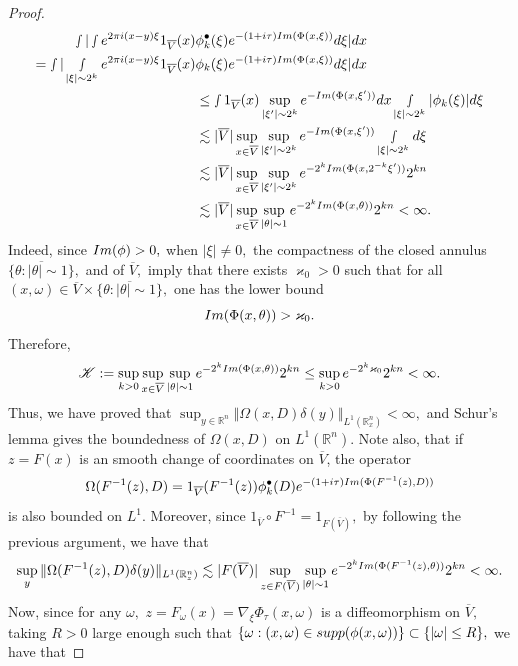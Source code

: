 \documentclass[12pt, reqno]{amsart}
\theoremstyle{definition}
\theoremstyle{remark}
\numberwithin{equation}{section}
\begin{document}
\begin{proof}
\begin{align*}
    \smallint|\smallint e^{2\pi i(x-y)\xi}1_{\overline{V}}(x) &\phi_{k}^\bullet(\xi)e^{-(1+i\tau)\textnormal{Im}(\Phi(x,\xi))}d\xi|dx \\
   = \smallint|\smallint_{|\xi|\sim 2^k} e^{2\pi i(x-y)\xi}1_{\overline{V}}(x) &\phi_{k}(\xi)e^{-(1+i\tau)\textnormal{Im}(\Phi(x,\xi))}d\xi|dx \\
    &\leq \smallint   1_{\overline{V}}(x)\sup_{|\xi'|\sim 2^{k}}e^{-\textnormal{Im}(\Phi(x,\xi'))} dx\smallint_{|\xi|\sim 2^{k}}|\phi_{k}(\xi)| d\xi\\
    &\lesssim |\overline{V}|\sup_{x\in \overline{V}} \sup_{|\xi'|\sim 2^{k}}e^{-\textnormal{Im}(\Phi(x,\xi'))}\smallint_{|\xi|\sim 2^{k}}d\xi\\
    &\lesssim |\overline{V}|\sup_{x\in \overline{V}} \sup_{|\xi'|\sim 2^{k}}e^{-2^{k}\textnormal{Im}(\Phi(x,2^{-k}\xi'))}2^{kn}\\
    & \lesssim |\overline{V}|\sup_{x\in \overline{V}} \sup_{|\theta|\sim 1}e^{-2^{k}\textnormal{Im}(\Phi(x,\theta))}2^{kn}<\infty.
\end{align*}Indeed, since $\textnormal{Im}(\phi)> 0,$ when $|\xi|\neq 0,$ the compactness of the closed annulus $\overline{\{\theta: |\theta|\sim 1\}},$ and of $\overline{V},$ imply that there exists $\varkappa_0>0$ such that for all $(x,\omega)\in \overline{V}\times \overline{\{\theta: |\theta|\sim 1\}},$ one has the lower bound $$\textnormal{Im}(\Phi(x,\theta))>\varkappa_0.$$ Therefore, 
$$\mathscr{K}:=\sup_{k>0}\sup_{x\in \overline{V}} \sup_{|\theta|\sim 1}e^{-2^{k}\textnormal{Im}(\Phi(x,\theta))}2^{kn}\leq \sup_{k>0} e^{-2^{k}\varkappa_0}2^{kn}<\infty.$$
Thus, we have proved that  $\sup_{y\in \mathbb{R}^n}\Vert  \Omega(x,D)\delta(y) \Vert_{L^1(\mathbb{R}^n_x)}<\infty,$ and Schur's lemma gives the boundedness of $\Omega(x,D)$ on $L^1(\mathbb{R}^n).$ Note also, that if $z=F(x)$ is an smooth change of coordinates on $\overline{V}$, the operator $$\Omega(F^{-1}(z),D)=1_{\overline{V}}(F^{-1}(z))\phi_{k}^\bullet(D)e^{-(1+i\tau)\textnormal{Im}(\Phi(F^{-1}(z),D))}$$ is also bounded on $L^1.$ Moreover, since $1_{\overline{V}}\circ F^{-1}=1_{F(\overline{V})},$ by following the previous argument, we have that
\begin{align*}
   \sup_{y}  \Vert \Omega(F^{-1}(z),D)\delta(y)\Vert_{L^1(\mathbb{R}^n_z)}\lesssim  |F(\overline{V})|\sup_{z\in F(\overline{V})} \sup_{|\theta|\sim 1}e^{-2^{k}\textnormal{Im}(\Phi(F^{-1}(z),\theta))}2^{kn}<\infty.
\end{align*}Now, since for any $\omega,$ $z=F_\omega(x)=\nabla_\xi\Phi_\tau(x,\omega)$ is a diffeomorphism on $\overline{V},$ taking $R>0$ large enough such that $\{\omega: (x,\omega)\in \textnormal{supp}(\phi(x,\omega))\}\subset\{|\omega|\leq R\},$ we have that

\end{proof}
\end{document}
